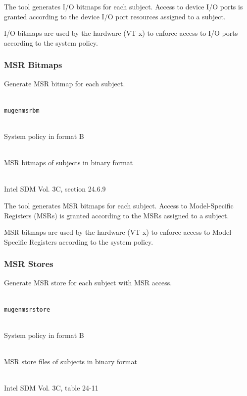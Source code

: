 \documentclass[a4paper,twoside,titlepage]{article}
\begin{document}
The tool generates I/O bitmaps for each subject. Access to device I/O ports is
granted according to the device I/O port resources assigned to a subject.

I/O bitmaps are used by the hardware (VT-x) to enforce access to I/O ports
according to the system policy.

\subsubsection{MSR Bitmaps}
Generate MSR bitmap for each subject.

\begin{description} \itemsep1pt \parskip0pt
	\item[Name] \hfill \\
		\texttt{mugenmsrbm}
	\item[Input] \hfill \\
		System policy in format B
	\item[Output] \hfill \\
		MSR bitmaps of subjects in binary format
	\item[Output format] \hfill \\
		Intel SDM Vol. 3C, section 24.6.9
\end{description}

The tool generates MSR bitmaps for each subject. Access to Model-Specific
Registers (MSRs) is granted according to the MSRs assigned to a subject.

MSR bitmaps are used by the hardware (VT-x) to enforce access to Model-Specific
Registers according to the system policy.

\subsubsection{MSR Stores}
Generate MSR store for each subject with MSR access.

\begin{description} \itemsep1pt \parskip0pt
	\item[Name] \hfill \\
		\texttt{mugenmsrstore}
	\item[Input] \hfill \\
		System policy in format B
	\item[Output] \hfill \\
		MSR store files of subjects in binary format
	\item[Output format] \hfill \\
		Intel SDM Vol. 3C, table 24-11
\end{description}
\end{document}
